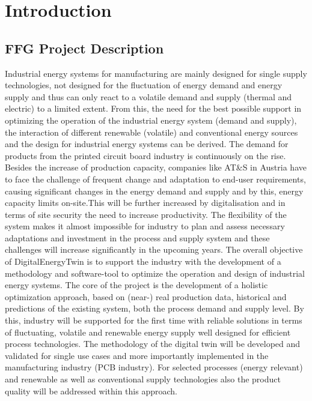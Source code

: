 \chapter{Introduction }
\label{cha:Introduction}

\section{FFG Project Description}
Industrial energy systems for manufacturing are mainly designed for single supply technologies, not designed for the fluctuation of energy demand and energy supply and thus can only react to a volatile demand and supply (thermal and electric) to a limited extent. From this, the need for the best possible support in optimizing the operation of the industrial energy system (demand and supply), the interaction of different renewable (volatile) and conventional energy sources and the design for industrial energy systems can be derived.
The demand for products from the printed circuit board industry is continuously on the rise. Besides the increase of production capacity, companies like AT\&S in Austria have to face the challenge of frequent change and adaptation to end-user requirements, causing significant changes in the energy demand and supply and by this, energy capacity limits on-site.This will be further increased by digitalisation and in terms of site security the need to increase productivity. The flexibility of the system makes it almost impossible for industry to plan and assess necessary adaptations and investment in the process and supply system and these challenges will increase significantly in the upcoming years.
The overall objective of DigitalEnergyTwin is to support the industry with the development of a methodology and software-tool to optimize the operation and design of industrial energy systems. The core of the project is the development of a  holistic optimization approach, based on (near-) real production data, historical and predictions of the existing system, both the process demand and supply level. By this, industry will be supported for the first time with reliable solutions in terms of fluctuating, volatile and renewable energy supply well designed for efficient process technologies. The methodology of the digital twin will be developed and validated for single use cases and more importantly implemented in the manufacturing industry (PCB industry). For selected processes (energy relevant) and renewable as well as conventional supply technologies also the product quality will be addressed within this approach.
